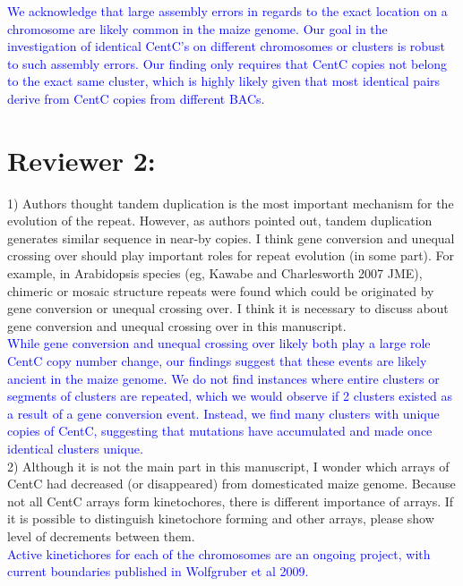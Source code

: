 \documentclass[]{article}
\newcommand{\res}[1]{\noindent \textcolor{blue}{{#1}} \\}
\begin{document}
\res{We acknowledge that large assembly errors in regards to the exact location on a chromosome are likely common in the maize genome.  
Our goal in the investigation of identical CentC’s on different chromosomes or clusters is robust to such assembly errors.  
Our finding only requires that CentC copies not belong to the exact same cluster, which is highly likely given that most identical pairs derive from CentC copies from different BACs.  
}

\section*{Reviewer 2:}

1) Authors thought tandem duplication is the most important mechanism for the evolution of the repeat. However, as authors pointed out, tandem duplication generates similar sequence in near-by copies. I think gene conversion and unequal crossing over should play important roles for repeat evolution (in some part). For example, in Arabidopsis species (eg, Kawabe and Charlesworth 2007 JME), chimeric or mosaic structure repeats were found which could be originated by gene conversion or unequal crossing over. I think it is necessary to discuss about gene conversion and unequal crossing over in this manuscript.\\

\res{While gene conversion and unequal crossing over likely both play a large role CentC copy number change, our findings suggest that these events are likely ancient in the maize genome.  We do not find instances where entire clusters or segments of clusters are repeated, which we would observe if 2 clusters existed as a result of a gene conversion event.  Instead, we find many clusters with unique copies of CentC, suggesting that mutations have accumulated and made once identical clusters unique.}

2) Although it is not the main part in this manuscript, I wonder which arrays of CentC had decreased (or disappeared) from domesticated maize genome. Because not all CentC arrays form kinetochores, there is different importance of arrays. If it is possible to distinguish kinetochore forming and other arrays, please show level of decrements between them.\\

\res{Active kinetichores for each of the chromosomes are an ongoing project, with current boundaries published in Wolfgruber et al 2009.}
\end{document}
